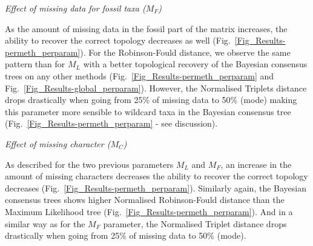\documentclass[12pt,letterpaper]{article}
\renewcommand{\subsection}[1]{%
\bigskip
\begin{center}
\begin{large}
\normalfont\itshape #1
\end{large}
\end{center}}
\begin{document}
\subsection{Effect of missing data for fossil taxa ($M_{F}$)}
As the amount of missing data in the fossil part of the matrix increases, the ability to recover the correct topology decreases as well (Fig.~\ref{Fig_Results-permeth_perparam}). For the Robinson-Fould distance, we observe the same pattern than for $M_{L}$ with a better topological recovery of the Bayesian consensus trees on any other methods (Fig.~\ref{Fig_Results-permeth_perparam} and Fig.~\ref{Fig_Results-global_perparam}). However, the Normalised Triplets distance drops drastically when going from 25\% of missing data to 50\% (mode) %
making this parameter more sensible to wildcard taxa in the Bayesian consensus tree (Fig.~\ref{Fig_Results-permeth_perparam} - see discussion). %

\subsection{Effect of missing character ($M_{C}$)}
As described for the two previous parameters $M_{L}$ and $M_{F}$, an increase in the amount of missing characters decreases the ability to recover the correct topology decreases (Fig.~\ref{Fig_Results-permeth_perparam}). Similarly again, the Bayesian consensus trees shows higher Normalised Robinson-Fould distance than the Maximum Likelihood tree (Fig.~\ref{Fig_Results-permeth_perparam}). And in a similar way as for the $M_{F}$ parameter, the Normalised Triplet distance drops drastically when going from 25\% of missing data to 50\% (mode). %

\end{document}
